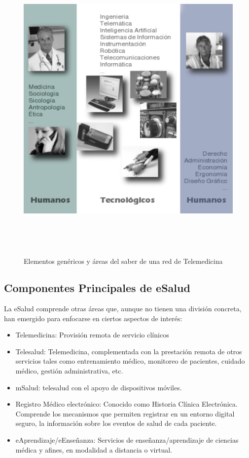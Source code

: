 \begin{figure}
 \centering
 \includegraphics[width=156mm, height=156mm]{sistema_telemedicina.png}
 \caption{Elementos genéricos y áreas del saber de una red de Telemedicina}
 \label{elementosred}
\end{figure}

\subsection{Componentes Principales de eSalud}

La eSalud comprende otras áreas que, aunque no tienen una división concreta, han emergido para enfocarse en ciertos aspectos de interés:

\begin{itemize}
 \item Telemedicina: Provisión remota de servicio clínicos
 \item Telesalud: Telemedicina, complementada con la prestación remota de otros servicios tales como entrenamiento médico, monitoreo de pacientes, cuidado médico, gestión administrativa, etc. 
 \item mSalud: telesalud con el apoyo de dispositivos móviles.
 \item Registro Médico electrónico: Conocido como Historia Clínica Electrónica. Comprende los mecanismos que permiten registrar en un entorno digital seguro, la información sobre los eventos de salud de cada paciente.
 \item eAprendizaje/eEnseñanza: Servicios de enseñanza/aprendizaje de ciencias médica y afines, en modalidad a distancia o virtual.
\end{itemize}

